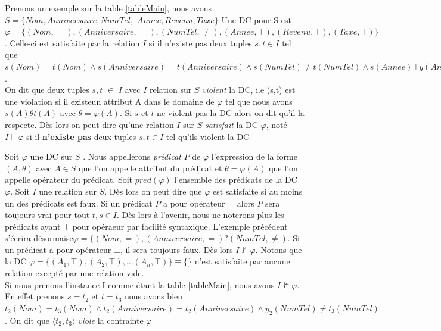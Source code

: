 \documentclass[letterpaper, 12pt]{report}
\theoremstyle{definition}
\begin{document}
Prenons un exemple sur la table \ref{tableMain}, nous avons $S=\{Nom, Anniversaire, NumTel,$ $Annee, Revenu, Taxe \}$ Une DC pour S est $\varphi =\{(Nom,=),(Anniversaire,=),(NumTel,\neq),(Annee,\top),(Revenu,\top) ,(Taxe,\top) \}$. Celle-ci est satisfaite par la relation $I$ si il n'existe pas deux tuples $s,t\in I$ tel que $s(Nom) = t(Nom) \wedge s(Anniversaire) = t(Anniversaire) \wedge s(NumTel) \neq t(NumTel) \wedge s(Annee) \top y(Annee) \wedge s(Revenu) \top t(Revenu) \wedge s(Taxe) \top t(Taxe)$.\\

On dit que deux tuples $s,t$ $\in$ $I$ avec $I$ relation sur $S$ \emph{violent} la DC, i.e (s,t) est une violation si il existeun attribut A dans le domaine de $\varphi$ tel que nous avons $s(A)\theta t(A)$ avec $\theta = \varphi(A)$. Si $s$ et $t$ ne violent pas la DC alors on dit qu'il la respecte. Dès lors on peut dire qu'une relation $I$ sur $S$ \emph{satisfait} la DC $\varphi$, noté $I \models \varphi$ si il \textbf{n'existe pas} deux tuples $s,t \in I$ tel qu'ils violent la DC

Soit $\varphi$ une DC sur $S$ . Nous appellerons \emph{prédicat} $P$ de $\varphi$ l'expression de la forme $(A,\theta)$ avec $A\in S$ que l'on appelle attribut du prédicat et $\theta = \varphi(A)$ que l'on appelle opérateur du prédicat. Soit $pred(\varphi)$ l'ensemble des prédicats de la DC $\varphi$. Soit $I$ une relation sur $S$. Dès lors on peut dire que $\varphi$ est satisfaite si au moins un des prédicats est faux. Si un prédicat $P$ a pour opérateur $\top$ alors $P$ sera toujours vrai pour tout $t,s \in I$. Dès lors à l'avenir, nous ne noterons plus les prédicats ayant $\top$ pour opéraeur par facilité syntaxique. L'exemple précédent s'écrira désormaisc$\varphi =\{(Nom,=),(Anniversaire,=)?(NumTel,\neq)$. Si un prédicat a pour opérateur $\bot$, il sera toujours faux. Dès lors $I \not\models \varphi$. Notons que la DC $\varphi = \{(A_1,\top),(A_2,\top),...(A_n,\top)\} \equiv \{ \}$ n'est satisfaite par aucune relation excepté par une relation vide.\\

 Si nous prenons l'instance I comme étant la table \ref{tableMain}, nous avons $I \not\models \varphi$. En effet prenons $s=t_2$ et $t=t_3$ nous avons bien $t_2(Nom) = t_3(Nom) \wedge t_2(Anniversaire) = t_2(Anniversaire) \wedge y_2(NumTel) \neq t_3(NumTel)$. On dit que $\langle t_2,t_3 \rangle$ \emph{viole} la contrainte $\varphi$\\ 
\end{document}
